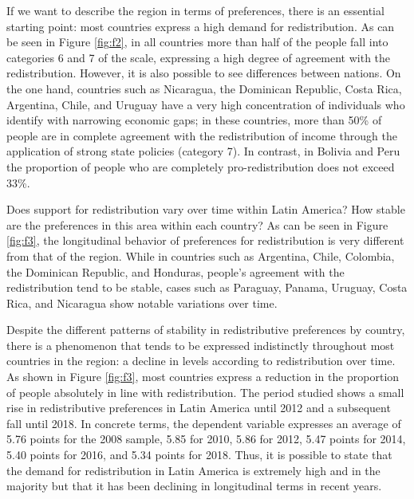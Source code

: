 \documentclass[utf8]{frontiersSCNS} %
\begin{document}
If we want to describe the region in terms of preferences, there is an essential starting point: most countries express a high demand for redistribution. As can be seen in Figure \ref{fig:f2}, in all countries more than half of the people fall into categories 6 and 7 of the scale, expressing a high degree of agreement with the redistribution. However, it is also possible to see differences between nations. On the one hand, countries such as Nicaragua, the Dominican Republic, Costa Rica, Argentina, Chile, and Uruguay have a very high concentration of individuals who identify with narrowing economic gaps; in these countries, more than 50\% of people are in complete agreement with the redistribution of income through the application of strong state policies (category 7). In contrast, in Bolivia and Peru the proportion of people who are completely pro-redistribution does not exceed 33\%.

Does support for redistribution vary over time within Latin America? How stable are the preferences in this area within each country? As can be seen in Figure \ref{fig:f3}, the longitudinal behavior of preferences for redistribution is very different from that of the region. While in countries such as Argentina, Chile, Colombia, the Dominican Republic, and Honduras, people’s agreement with the redistribution tend to be stable, cases such as Paraguay, Panama, Uruguay, Costa Rica, and Nicaragua show notable variations over time.

Despite the different patterns of stability in redistributive preferences by country, there is a phenomenon that tends to be expressed indistinctly throughout most countries in the region: a decline in levels according to redistribution over time. As shown in Figure \ref{fig:f3}, most countries express a reduction in the proportion of people absolutely in line with redistribution. The period studied shows a small rise in redistributive preferences in Latin America until 2012 and a subsequent fall until 2018. In concrete terms, the dependent variable expresses an average of 5.76 points for the 2008 sample, 5.85 for 2010, 5.86 for 2012, 5.47 points for 2014, 5.40 points for 2016, and 5.34 points for 2018. Thus, it is possible to state that the demand for redistribution in Latin America is extremely high and in the majority but that it has been declining in longitudinal terms in recent years.
\end{document}
